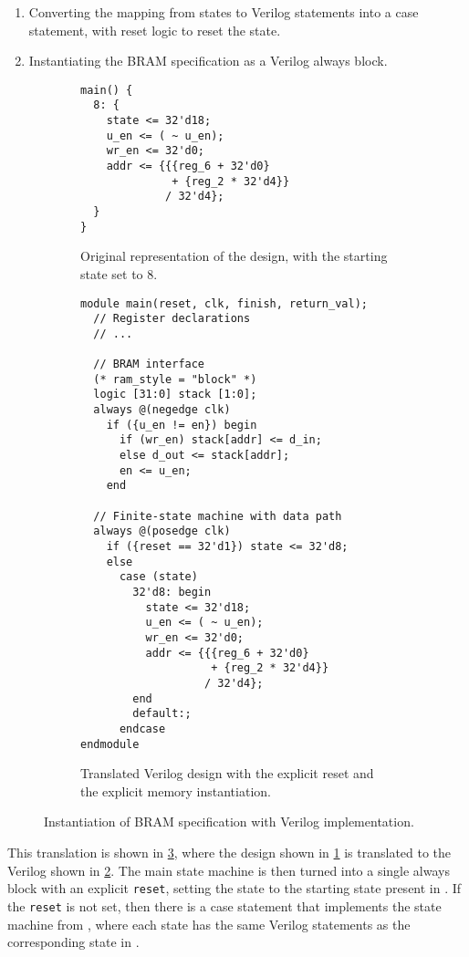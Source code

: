 \begin{enumerate}
\item Converting the mapping from states to Verilog statements into a case
  statement, with reset logic to reset the state.
\item Instantiating the \gls{BRAM} specification as a Verilog always block.
\end{enumerate}

\begin{figure}
  \centering
  \begin{subfigure}{0.45\linewidth}
\begin{verbatim}
main() {
  8: {
    state <= 32'd18;
    u_en <= ( ~ u_en);
    wr_en <= 32'd0;
    addr <= {{{reg_6 + 32'd0}
              + {reg_2 * 32'd4}}
             / 32'd4};
  }
}
\end{verbatim}
    \caption{Original \htl{} representation of the design, with the starting
      state set to 8.}%
    \label{fig:hg:ram-instantiation:htl}
  \end{subfigure}\hfill%
  \begin{subfigure}{0.5\linewidth}
\begin{verbatim}
module main(reset, clk, finish, return_val);
  // Register declarations
  // ...

  // BRAM interface
  (* ram_style = "block" *)
  logic [31:0] stack [1:0];
  always @(negedge clk)
    if ({u_en != en}) begin
      if (wr_en) stack[addr] <= d_in;
      else d_out <= stack[addr];
      en <= u_en;
    end

  // Finite-state machine with data path
  always @(posedge clk)
    if ({reset == 32'd1}) state <= 32'd8;
    else
      case (state)
        32'd8: begin
          state <= 32'd18;
          u_en <= ( ~ u_en);
          wr_en <= 32'd0;
          addr <= {{{reg_6 + 32'd0}
                    + {reg_2 * 32'd4}}
                   / 32'd4};
        end
        default:;
      endcase
endmodule
\end{verbatim}
    \caption{Translated Verilog design with the explicit reset and the explicit
      memory instantiation.}%
    \label{fig:hg:ram-instantiation:verilog}
  \end{subfigure}
  \caption{Instantiation of \gls{BRAM} specification with Verilog implementation.}%
  \label{fig:hg:ram-instantiation}
\end{figure}

This translation is shown in \cref{fig:hg:ram-instantiation}, where the \htl{}
design shown in \cref{fig:hg:ram-instantiation:htl} is translated to the Verilog
shown in \cref{fig:hg:ram-instantiation:verilog}.  The main state machine is
then turned into a single always block with an explicit \texttt{reset}, setting
the state to the starting state present in \htl{}.  If the \texttt{reset} is not
set, then there is a case statement that implements the state machine from
\htl{}, where each state has the same Verilog statements as the corresponding
state in \htl{}.

